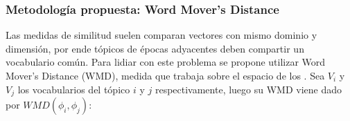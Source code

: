 \documentclass[
	spanish, %
	aspectratio=43, %
	hyperref={pdfencoding=auto,psdextra},
	xcolor={dvipsnames,table,usenames}
]{beamer}
\begin{document}
\begin{frame}
\frametitle{Metodología propuesta: Word Mover's Distance}





Las medidas de similitud suelen comparan vectores con mismo dominio y dimensión, por ende tópicos de épocas adyacentes deben compartir un vocabulario común. Para lidiar con este problema se propone utilizar Word Mover's Distance (WMD)\cite{kusner2015word}, medida que trabaja sobre el espacio de los .
Sea  $V_{i}$ y $V_{j}$ los vocabularios del tópico $i$ y $j$ respectivamente, luego su WMD viene dado por $WMD(\phi_{i}, \phi_{j})$:


\end{frame}
\end{document}
